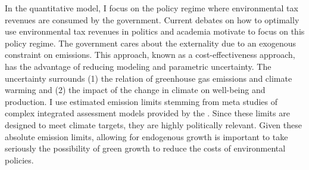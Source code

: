 


In the quantitative model, I focus on the policy regime where environmental tax revenues are consumed by the government.
Current debates on how to optimally use environmental tax revenues in politics \citep{Baker2017TheDividends} and academia \citep[e.g.][]{Fried2018TheGenerations, Carattini2018} motivate to focus on this policy regime. 
 The government cares about the externality due to an exogenous constraint on emissions. This approach, known as a cost-effectiveness approach, has the advantage of reducing modeling and parametric uncertainty. The uncertainty surrounds (1) the relation of greenhouse gas emissions and climate warming and (2) the impact of the change in climate on well-being and production. I  use estimated emission limits stemming from meta studies of complex integrated assessment models provided by the \cite{IPCC2022}. Since these limits are designed to meet climate targets, they are highly politically relevant.  
Given these absolute emission limits, allowing for endogenous growth is important to take seriously the possibility of green growth to reduce the costs of environmental policies. %


